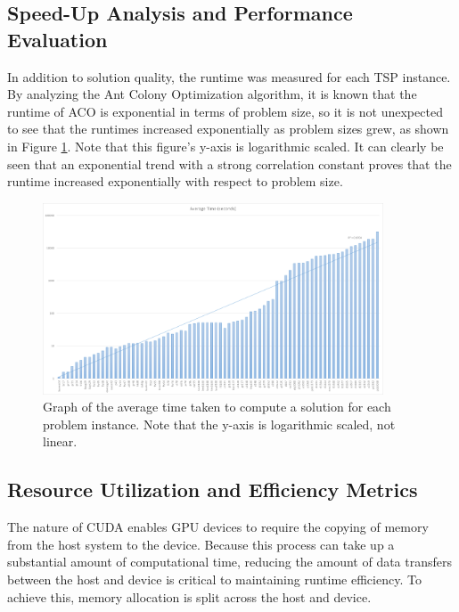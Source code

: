 \documentclass[11pt]{report}
\begin{document}
        \subsection{Speed-Up Analysis and Performance Evaluation}
            In addition to solution quality, the runtime was measured for each TSP instance. By analyzing the Ant Colony Optimization algorithm, it is known that the runtime of ACO is exponential in terms of problem size, so it is not unexpected to see that the runtimes increased exponentially as problem sizes grew, as shown in Figure \ref{fig:time}. Note that this figure's y-axis is logarithmic scaled. It can clearly be seen that an exponential trend with a strong correlation constant proves that the runtime increased exponentially with respect to problem size. 

            \begin{figure}[h!]
                \centering
                \includegraphics[width=0.9\textwidth,keepaspectratio]{Images/Time}
                \caption{Graph of the average time taken to compute a solution for each problem instance. Note that the y-axis is logarithmic scaled, not linear.}
                \label{fig:time}
            \end{figure}
            \newpage
            

        \subsection{Resource Utilization and Efficiency Metrics}
            The nature of CUDA enables GPU devices to require the copying of memory from the host system to the device. Because this process can take up a substantial amount of computational time, reducing the amount of data transfers between the host and device is critical to maintaining runtime efficiency. To achieve this, memory allocation is split across the host and device.
\end{document}
